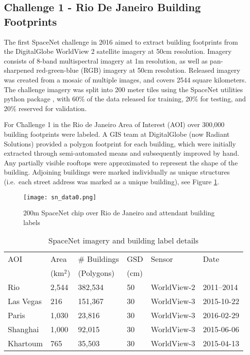 \documentclass{article}
\begin{document}
\subsection{Challenge 1 - Rio De Janeiro Building Footprints}
The first SpaceNet challenge in 2016 aimed to extract building footprints from the DigitalGlobe WorldView 2 satellite imagery at 50cm resolution.  Imagery consists of 8-band multispectral imagery at 1m resolution, as well as pan-sharpened red-green-blue (RGB) imagery at 50cm resolution.  Released imagery was created from a mosaic of multiple images, and covers 2544 square kilometers.  The challenge imagery was split into 200 meter tiles using the SpaceNet utilities python package \cite{sn_utils},
with 60\% of the data released for training, 20\% for testing, and 20\% reserved for validation. 

For Challenge 1 in the Rio de Janeiro Area of Interest (AOI) over 300,000 building footprints were labeled.
A GIS team at DigitalGlobe (now Radiant Solutions) provided a polygon footprint for each building, which were initially extracted through semi-automated means and subsequently improved by hand.  
Any partially visible rooftops were approximated to represent the shape of the building. Adjoining buildings were marked individually as unique structures (i.e.~each street address was marked as a unique building), see Figure \ref{fig:sn_data0}.



\begin{figure}
  \centering
     \texttt{[image: sn\_data0.png]}
  \caption{200m SpaceNet chip over Rio de Janeiro and attendant building labels}
  \label{fig:sn_data0}
\end{figure}




\begin{table}
  \caption{SpaceNet imagery and building label details}
  \label{tab:data_area}
  \centering
   \begin{tabular}{llllll}
    \toprule
AOI 	& Area  & \# Buildings & GSD & Sensor & Date \\& (km$^2$) & (Polygons) & (cm) & & \\
\toprule
Rio & 2,544 &	382,534	& 50 &	WorldView-2	& 2011--2014 \\Las Vegas & 216 & 151,367 &	30	 & WorldView-3 & 2015-10-22  \\Paris & 1,030 & 23,816 & 30 & WorldView-3 & 2016-02-29  \\Shanghai & 1,000 & 92,015 & 30 & WorldView-3 & 2015-06-06  \\Khartoum & 765 & 35,503 & 30 & WorldView-3 & 2015-04-13  \\

    \bottomrule
  \end{tabular}
\end{table}
\end{document}
